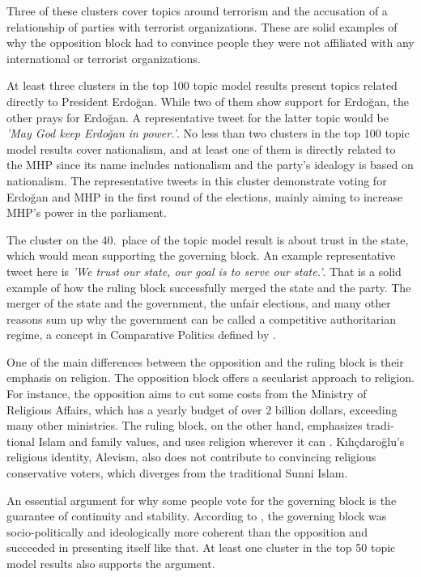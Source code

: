 Three of these clusters cover topics around terrorism and the accusation of a relationship of parties 
with terrorist organizations. These are solid examples of why the opposition block had to convince 
people they were not affiliated with any international or terrorist organizations. 

At least three clusters in the top 100 topic model results present topics related directly to 
President Erdo­ğan. While two of them show support for Erdo­ğan, the other prays for Erdo­ğan. A 
representative tweet for the latter topic would be \textit{'May God keep Erdo­ğan in power.'}. No 
less than two clusters in the top 100 topic model results cover nationalism, and at least one of them 
is directly related to the \ac{MHP} since its name includes nationalism and the party's idealogy is based on nationalism. 
The representative tweets 
in this cluster demonstrate voting for Erdo­ğan and \ac{MHP} in the first round of the elections, 
mainly aiming to increase \ac{MHP}'s power in the parliament.

The cluster on the 40.\ place of the topic model result is about trust in the state, which would 
mean supporting the governing block. An example representative tweet here is 
\textit{'We trust our state, our goal is to serve our state.'}. That is a solid example of how the 
ruling block successfully merged the state and the party. The merger of the state and the government, 
the unfair elections, and many other reasons sum up why the government can be called a competitive 
authoritarian regime, a concept in Comparative Politics defined by \textcite{levitsky_elections_2002}.

One of the main differences between the opposition and the ruling block is their emphasis on 
religion. The opposition block offers a secularist approach to religion. For instance, the opposition 
aims to cut some costs from the Ministry of Religious Affairs, which has a yearly budget of over 
2 billion dollars, exceeding many other ministries. The ruling block, on the other hand, emphasizes 
tradi­tional Islam and family values, and uses religion wherever it can 
\parencite{cevik_aksoy_aydin_turkey_after_elections_2023}. Kılıçdaroğlu's religious identity, 
Alevism, also does not contribute to convincing religious conservative voters, which diverges 
from the traditional Sunni Islam.

An essential argument for why some people vote for the governing block is the guarantee of continuity 
and stability. According to \textcite{cevik_aksoy_aydin_turkey_after_elections_2023}, the governing 
block was socio-politically and ideologically more coherent than the oppo­sition and succeeded 
in presenting itself like that. At least one cluster in the top 50 topic model results also 
supports the argument.

